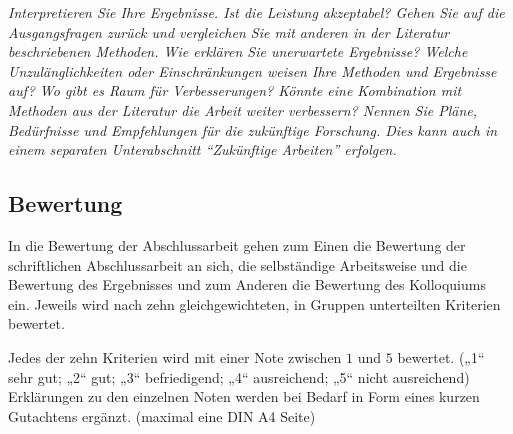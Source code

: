  \emph{Interpretieren Sie Ihre Ergebnisse. Ist die Leistung akzeptabel? Gehen Sie auf die Ausgangsfragen zurück und vergleichen Sie mit anderen in der Literatur beschriebenen Methoden. Wie erklären Sie unerwartete Ergebnisse? Welche Unzulänglichkeiten oder Einschränkungen weisen Ihre Methoden und Ergebnisse auf? Wo gibt es Raum für Verbesserungen? Könnte eine Kombination mit Methoden aus der Literatur die Arbeit weiter verbessern? Nennen Sie Pläne, Bedürfnisse und Empfehlungen für die zukünftige Forschung. Dies kann auch in einem separaten Unterabschnitt ``Zukünftige Arbeiten'' erfolgen.}
 
 
 \subsection*{Bewertung}


In die Bewertung der Abschlussarbeit gehen zum Einen die Bewertung der schriftlichen Abschlussarbeit an sich, die selbständige Arbeitsweise und die Bewertung des Ergebnisses und zum Anderen die Bewertung des Kolloquiums ein. Jeweils wird nach zehn gleichgewichteten, in Gruppen unterteilten Kriterien bewertet.



Jedes der zehn Kriterien wird mit einer Note zwischen $1$ und $5$ bewertet. („1“ sehr gut; „2“ gut; „3“ befriedigend; „4“ ausreichend; „5“ nicht ausreichend)  Erklärungen zu den einzelnen Noten werden bei Bedarf in Form eines kurzen Gutachtens ergänzt. (maximal eine DIN A4 Seite)


